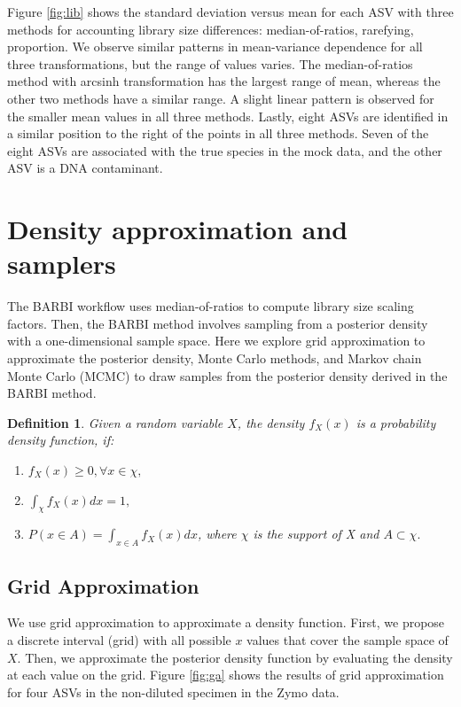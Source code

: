 \documentclass[12pt]{article}
\begin{document}
Figure \ref{fig:lib} shows the standard deviation versus mean for each ASV with three methods for accounting library size differences: median-of-ratios, rarefying, proportion. We observe similar patterns in mean-variance dependence for all three transformations, but the range of values varies. The median-of-ratios method with arcsinh transformation has the largest range of mean, whereas the other two methods have a similar range. A slight linear pattern is observed for the smaller mean values in all three methods. Lastly, eight ASVs are identified in a similar position to the right of the points in all three methods. Seven of the eight ASVs are associated with the true species in the mock data, and the other ASV is a DNA contaminant. 


\section{Density approximation and samplers}

The BARBI workflow uses median-of-ratios to compute library size scaling factors.  Then, the BARBI method involves sampling from a posterior density with a one-dimensional sample space. Here we explore grid approximation to approximate the posterior density, Monte Carlo methods, and Markov chain Monte Carlo (MCMC) to draw samples from the posterior density derived in the BARBI method. 

\newtheorem{definition}{Definition}
\begin{definition}
Given a random variable $X$, the density $f_X(x)$ is a probability density function, if:
\begin{enumerate}
	\item {$f_X(x) \geq 0 , \forall x \in \chi,$}
	\item {$\int_{\chi}f_X(x) dx  = 1, $}
	\item {$ P( x \in A ) = \int_{x \in A} f_X(x) dx$, where $\chi$ is the support of X and  $A \subset \chi.$}
\end{enumerate}
\end{definition}

\subsection{Grid Approximation}

We use grid approximation to approximate a density function. First, we propose a discrete interval (grid) with all possible $x$ values that cover the sample space of $X$. Then, we approximate the posterior density function by evaluating the density at each value on the grid. Figure \ref{fig:ga} shows the results of grid approximation for four ASVs in the non-diluted specimen in the Zymo data.
\end{document}
